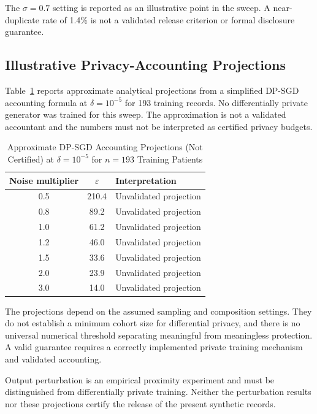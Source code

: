 \documentclass[journal,onecolumn]{IEEEtran}
\begin{document}
The $\sigma=0.7$ setting is reported as an illustrative point in the sweep. A near-duplicate rate of 1.4\% is not a validated release criterion or formal disclosure guarantee.

\subsection{Illustrative Privacy-Accounting Projections}

Table~\ref{tab:dpsgd} reports approximate analytical projections from a simplified DP-SGD accounting formula at $\delta=10^{-5}$ for 193 training records. No differentially private generator was trained for this sweep. The approximation is not a validated accountant and the numbers must not be interpreted as certified privacy budgets.

\begin{table}[!t]
  \centering
  \caption{Approximate DP-SGD Accounting Projections (Not Certified) at $\delta = 10^{-5}$ for $n = 193$ Training Patients}
  \label{tab:dpsgd}
  \begin{tabular}{ccl}
    \toprule
    Noise multiplier & $\varepsilon$ & Interpretation \\
    \midrule
    0.5 & 210.4 & Unvalidated projection \\
    0.8 & 89.2 & Unvalidated projection \\
    1.0 & 61.2 & Unvalidated projection \\
    1.2 & 46.0 & Unvalidated projection \\
    1.5 & 33.6 & Unvalidated projection \\
    2.0 & 23.9 & Unvalidated projection \\
    3.0 & 14.0 & Unvalidated projection \\
    \bottomrule
  \end{tabular}
\end{table}

The projections depend on the assumed sampling and composition settings. They do not establish a minimum cohort size for differential privacy, and there is no universal numerical threshold separating meaningful from meaningless protection. A valid guarantee requires a correctly implemented private training mechanism and validated accounting.

Output perturbation is an empirical proximity experiment and must be distinguished from differentially private training. Neither the perturbation results nor these projections certify the release of the present synthetic records.
\end{document}
